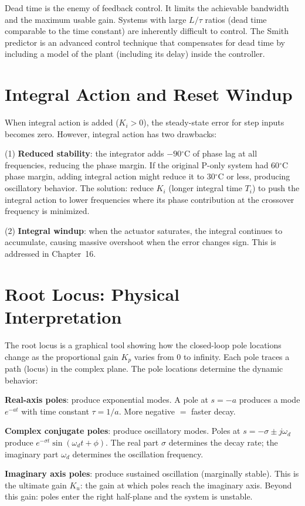 \documentclass[11pt,letterpaper,twoside,openany]{book}
\newcommand{\degC}{\ensuremath{{}^{\circ}\text{C}}}
\begin{document}
Dead time is the enemy of feedback control. It limits the achievable bandwidth and the maximum usable gain. Systems with large $L/\tau$ ratios (dead time comparable to the time constant) are inherently difficult to control. The Smith predictor is an advanced control technique that compensates for dead time by including a model of the plant (including its delay) inside the controller.

\section{Integral Action and Reset Windup}
When integral action is added ($K_i > 0$), the steady-state error for step inputs becomes zero. However, integral action has two drawbacks:

(1) \textbf{Reduced stability}: the integrator adds $-90$\degC{} of phase lag at all frequencies, reducing the phase margin. If the original P-only system had 60\degC{} phase margin, adding integral action might reduce it to 30\degC{} or less, producing oscillatory behavior. The solution: reduce $K_i$ (longer integral time $T_i$) to push the integral action to lower frequencies where its phase contribution at the crossover frequency is minimized.

(2) \textbf{Integral windup}: when the actuator saturates, the integral continues to accumulate, causing massive overshoot when the error changes sign. This is addressed in Chapter~16.
\section{Root Locus: Physical Interpretation}
The root locus is a graphical tool showing how the closed-loop pole locations change as the proportional gain $K_p$ varies from 0 to infinity. Each pole traces a path (locus) in the complex plane. The pole locations determine the dynamic behavior:

\textbf{Real-axis poles}: produce exponential modes. A pole at $s = -a$ produces a mode $e^{-at}$ with time constant $\tau = 1/a$. More negative $=$ faster decay.

\textbf{Complex conjugate poles}: produce oscillatory modes. Poles at $s = -\sigma \pm j\omega_d$ produce $e^{-\sigma t}\sin(\omega_d t + \phi)$. The real part $\sigma$ determines the decay rate; the imaginary part $\omega_d$ determines the oscillation frequency.

\textbf{Imaginary axis poles}: produce sustained oscillation (marginally stable). This is the ultimate gain $K_u$: the gain at which poles reach the imaginary axis. Beyond this gain: poles enter the right half-plane and the system is unstable.
\end{document}
